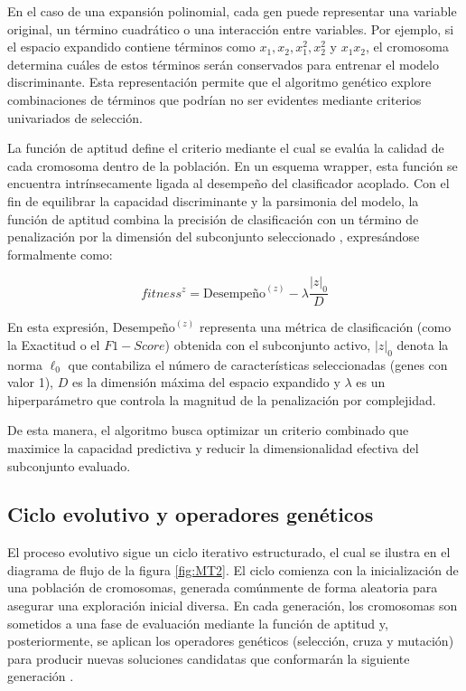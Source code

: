 En el caso de una expansión polinomial, cada gen puede representar una variable original, un término cuadrático o una interacción entre variables. Por ejemplo, si el espacio expandido contiene términos como $x_1,x_2,x_1^2,x_2^2$ y $x_1x_2$, el cromosoma determina cuáles de estos términos serán conservados para entrenar el modelo discriminante. Esta representación permite que el algoritmo genético explore combinaciones de términos que podrían no ser evidentes mediante criterios univariados de selección.

La función de aptitud define el criterio mediante el cual se evalúa la calidad de cada cromosoma dentro de la población. En un esquema wrapper, esta función se encuentra intrínsecamente ligada al desempeño del clasificador acoplado. Con el fin de equilibrar la capacidad discriminante y la parsimonia del modelo, la función de aptitud combina la precisión de clasificación con un término de penalización por la dimensión del subconjunto seleccionado \cite{siedlecki1989note}, expresándose formalmente como:

\begin{equation}
	fitness^{z} = \text{Desempeño}^{(z)}-\lambda \frac{|z|_0}{D}
	\label{eq:EMT14}
\end{equation}

En esta expresión, $\text{Desempeño}^{(z)}$ representa una métrica de clasificación (como la Exactitud o el $F1-Score$) obtenida con el subconjunto activo, $|z|_0$ denota la norma $\ell_0$ que contabiliza el número de características seleccionadas (genes con valor 1), $D$ es la dimensión máxima del espacio expandido y $\lambda$ es un hiperparámetro que controla la magnitud de la penalización por complejidad. 

De esta manera, el algoritmo busca optimizar un criterio combinado que maximice la capacidad predictiva y reducir la dimensionalidad efectiva del subconjunto evaluado.

\subsection{Ciclo evolutivo y operadores genéticos}

El proceso evolutivo sigue un ciclo iterativo estructurado, el cual se ilustra en el diagrama de flujo de la figura \ref{fig:MT2}. El ciclo comienza con la inicialización de una población de cromosomas, generada comúnmente de forma aleatoria para asegurar una exploración inicial diversa. En cada generación, los cromosomas son sometidos a una fase de evaluación mediante la función de aptitud y, posteriormente, se aplican los operadores genéticos (selección, cruza y mutación) para producir nuevas soluciones candidatas que conformarán la siguiente generación \cite{Goldberg1988}.

